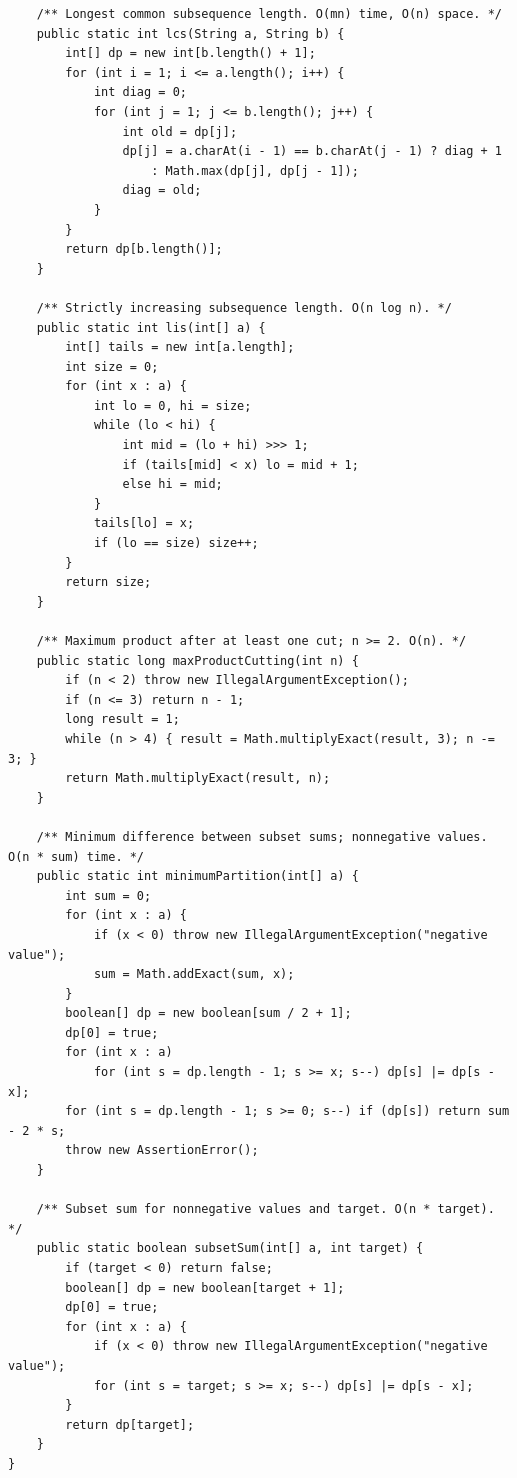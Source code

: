\documentclass[10pt,letterpaper]{article}
\begin{document}
\begin{lstlisting}
    /** Longest common subsequence length. O(mn) time, O(n) space. */
    public static int lcs(String a, String b) {
        int[] dp = new int[b.length() + 1];
        for (int i = 1; i <= a.length(); i++) {
            int diag = 0;
            for (int j = 1; j <= b.length(); j++) {
                int old = dp[j];
                dp[j] = a.charAt(i - 1) == b.charAt(j - 1) ? diag + 1
                    : Math.max(dp[j], dp[j - 1]);
                diag = old;
            }
        }
        return dp[b.length()];
    }

    /** Strictly increasing subsequence length. O(n log n). */
    public static int lis(int[] a) {
        int[] tails = new int[a.length];
        int size = 0;
        for (int x : a) {
            int lo = 0, hi = size;
            while (lo < hi) {
                int mid = (lo + hi) >>> 1;
                if (tails[mid] < x) lo = mid + 1;
                else hi = mid;
            }
            tails[lo] = x;
            if (lo == size) size++;
        }
        return size;
    }

    /** Maximum product after at least one cut; n >= 2. O(n). */
    public static long maxProductCutting(int n) {
        if (n < 2) throw new IllegalArgumentException();
        if (n <= 3) return n - 1;
        long result = 1;
        while (n > 4) { result = Math.multiplyExact(result, 3); n -= 3; }
        return Math.multiplyExact(result, n);
    }

    /** Minimum difference between subset sums; nonnegative values. O(n * sum) time. */
    public static int minimumPartition(int[] a) {
        int sum = 0;
        for (int x : a) {
            if (x < 0) throw new IllegalArgumentException("negative value");
            sum = Math.addExact(sum, x);
        }
        boolean[] dp = new boolean[sum / 2 + 1];
        dp[0] = true;
        for (int x : a)
            for (int s = dp.length - 1; s >= x; s--) dp[s] |= dp[s - x];
        for (int s = dp.length - 1; s >= 0; s--) if (dp[s]) return sum - 2 * s;
        throw new AssertionError();
    }

    /** Subset sum for nonnegative values and target. O(n * target). */
    public static boolean subsetSum(int[] a, int target) {
        if (target < 0) return false;
        boolean[] dp = new boolean[target + 1];
        dp[0] = true;
        for (int x : a) {
            if (x < 0) throw new IllegalArgumentException("negative value");
            for (int s = target; s >= x; s--) dp[s] |= dp[s - x];
        }
        return dp[target];
    }
}
\end{lstlisting}
\end{document}
